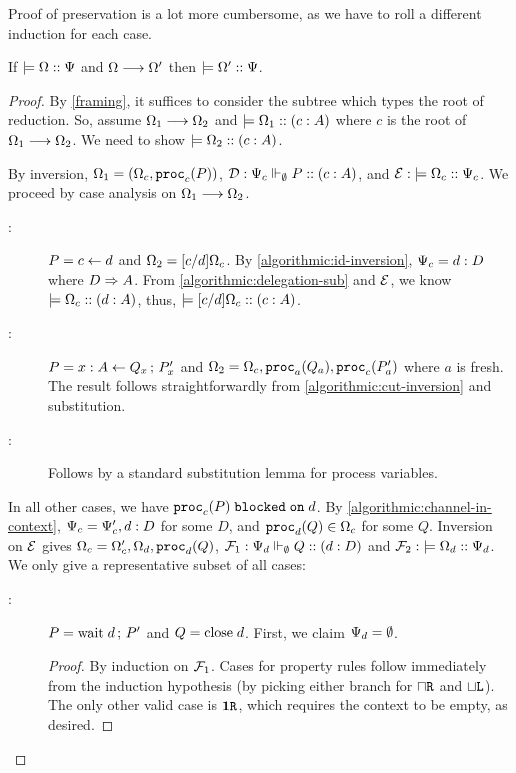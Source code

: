 Proof of preservation is a lot more cumbersome, as we have to roll a different induction for each case.
\begin{theorem}[Preservation]
If $\providesCtx \config \ctx$ and $\steps{\config}{\config'}$ then $\providesCtx {\config'} \ctx$.
\end{theorem}
\begin{proof}
  By \cref{framing}, it suffices to consider the subtree which types the root of reduction. So, assume $\steps{\config_1}{\config_2}$ and $\provides {\config_1} c A$ where $c$ is the root of $\steps{\config_1}{\config_2}$. We need to show $\provides {\config_2} c A$.

  By inversion, $\config_1 = \parens{\config_c, \proc c P}$, $\DD : \typeRecA {\ctx_c} \emptyset P c A$, and $\EE :\;\providesCtx {\config_c} {\ctx_c}$. We proceed by case analysis on $\steps{\config_1}{\config_2}$.
  \begin{description}
    \item[ :] $P = \tfwd c d$ and $\config_2 = \subst c d {\config_c}$. By \cref{algorithmic:id-inversion}, $\ctx_c = d : D$ where $D \subASing A$. From \cref{algorithmic:delegation-sub} and $\EE$, we know $\provides {\config_c} d A$, thus, $\provides {\subst c d {\config_c}} c A$.

    \item[ :] $P = \tspawnType x {Q_x} A {P'_x}$ and $\config_2 = \config_c, \proc a {Q_a}, \proc c {P'_a}$ where $a$ is fresh. The result follows straightforwardly from \cref{algorithmic:cut-inversion} and substitution.

    \item[ :] Follows by a standard substitution lemma for process variables.
  \end{description}

  In all other cases, we have $\blockedOn {\proc c P} d$. By \cref{algorithmic:channel-in-context}, $\ctx_c = \ctx_c', d : D$ for some $D$, and $\proc d Q \in \config_c$ for some $Q$.   Inversion on $\EE$ gives $\config_c = \config_c', \config_d, \proc d Q$, $\FF_1 : \typeRecA {\ctx_d} \emptyset Q d D$ and $\FF_2 :\;\providesCtx {\config_d} {\ctx_d}$. We only give a representative subset of all cases:
  \begin{description}
    \item[ :] $P = \twait d {P'}$ and $Q = \tclose d$. First, we claim $\ctx_d = \emptyCtx$.
    \begin{proof}
      By induction on $\FF_1$. Cases for property rules follow immediately from the induction hypothesis (by picking either branch for $\intersect\Right$ and $\union\Left$). The only other valid case is $\terminate\Right$, which requires the context to be empty, as desired.
    \end{proof}


\end{description}
\end{proof}
